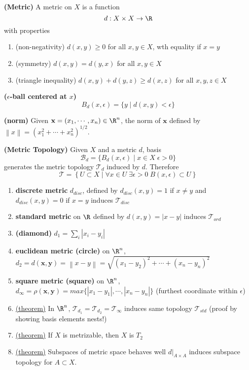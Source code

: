 \documentclass[10.5pt]{article}
\newcommand{\calB}{\mathcal{B}}
\newcommand{\calT}{\mathcal{T}}
\newcommand{\bx}{\mathbf{x}}
\newcommand{\by}{\mathbf{y}}
\renewcommand{\norm}[1]{\left\lVert#1\right\rVert}
\begin{document}
\begin{defn*}
    \textbf{(Metric)} A metric on $X$ is a function
    \[
        d: X\times X \to \R    
    \]
    with properties
    \begin{enumerate}
        \item (non-negativity) $d(x,y)\geq 0$ for all $x,y\in X$, wth equality if $x=y$
        \item (symmetry) $d(x,y) = d(y,x)$ for all $x,y\in X$
        \item (triangle inequality) $d(x,y) + d(y,z) \geq d(x,z)$ for all $x,y,z\in X$
    \end{enumerate}
\end{defn*}

\begin{defn*}
    \textbf{($\epsilon$-ball centered at $x$)}
    \[
        B_d(x, \epsilon) = \{y \mid d(x,y) < \epsilon\}
    \]
\end{defn*}

\begin{defn*}
    \textbf{(norm)} Given $\bx = (x_1,\cdots, x_n)\in \R^n$, the norm of $\bx$ defined by $\norm{x} = (x_1^2 + \cdots + x_n^2)^{1/2}$.
\end{defn*}

\begin{defn*}
    \textbf{(Metric Topology)}
    Given $X$ and a metric $d$, basis 
    \[
        \calB_{d} = 
        \{
            B_d(x,\epsilon) \mid x\in X \; \epsilon > 0
        \}
    \]
    generates the metric topology $\calT_d$ induced by $d$. Therefore 
    \[
        \calT =
        \left\{
            U\subset X \mid \forall x\in U \; \exists \epsilon > 0 \; B(x,\epsilon) \subset U
        \right\}
    \]
    \begin{enumerate}
        \item \textbf{discrete metric} $d_{disc}$, defined by $d_{disc}(x,y)=1$ if $x\neq y$ and $d_{disc}(x,y)=0$ if $x=y$ induces $\calT_{disc}$
        \item \textbf{standard metric} on $\R$ defined by $d(x,y) = |x-y|$ induces $\calT_{ord}$
        \item \textbf{(diamond)} $d_1 = \textstyle \sum_i |x_i - y_i|$
        \item \textbf{euclidean metric (circle)} on $\R^n$, $d_2 = d(\bx, \by) = \norm{x-y} = \sqrt{(x_1-y_2)^2 + \cdots + (x_n - y_n)^2}    $
        \item \textbf{square metric (square)} on $\R^n$, $d_{\infty} = \rho(\bx, \by) = max \{ |x_1 - y_1| ,\cdots , |x_n - y_n| \}$ (furthest coordinate within $\epsilon$)
        \item \underline{(theorem)} In $\R^n$, $\calT_{d_1} = \calT_{d_2} = \calT_{\infty}$ induces same topology $\calT_{std}$ (proof by showing basis elements nests!)
        \item \underline{(theorem)} If $X$ is metrizable, then $X$ is $T_2$
        \item \underline{(theorem)} Subspaces of metric space behaves well $d|_{A\times A}$ induces subspace topology for $A\subset X$.
    \end{enumerate}
\end{defn*}
\end{document}
